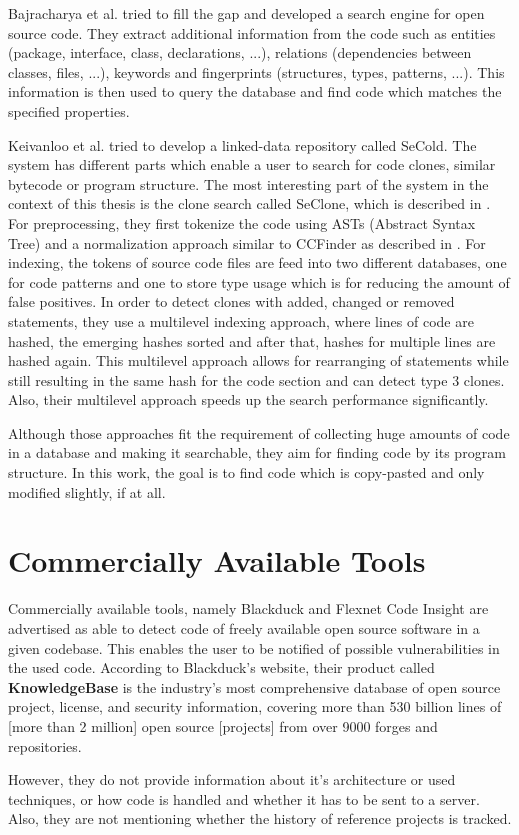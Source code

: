 Bajracharya et al. \cite{bajracharya2006sourcerer} tried to fill the gap and developed a search engine for open source code.
They extract additional information from the code such as entities (package, interface, class, declarations, ...), relations (dependencies between classes, files, ...), keywords and fingerprints (structures, types, patterns, ...).
This information is then used to query the database and find code which matches the specified properties.

Keivanloo et al. \cite{keivanloo2012leveraging,keivanloo2011internet,keivanloo2011seclone,keivanloo2010semantic} tried to develop a linked-data repository called SeCold.
The system has different parts which enable a user to search for code clones, similar bytecode or program structure.
The most interesting part of the system in the context of this thesis is the clone search called SeClone, which is described in \cite{keivanloo2011internet,keivanloo2011seclone}.
For preprocessing, they first tokenize the code using ASTs (Abstract Syntax Tree) and a normalization approach similar to CCFinder as described in \cite{kamiya2002ccfinder}.
For indexing, the tokens of source code files are feed into two different databases, one for code patterns and one to store type usage which is for reducing the amount of false positives.
In order to detect clones with added, changed or removed statements, they use a multilevel indexing approach, where lines of code are hashed, the emerging hashes sorted and after that, hashes for multiple lines are hashed again.
This multilevel approach allows for rearranging of statements while still resulting in the same hash for the code section and can detect type 3 clones.
Also, their multilevel approach speeds up the search performance significantly.

Although those approaches fit the requirement of collecting huge amounts of code in a database and making it searchable, they aim for finding code by its program structure.
In this work, the goal is to find code which is copy-pasted and only modified slightly, if at all.

\section{Commercially Available Tools}
Commercially available tools, namely Blackduck and Flexnet Code Insight are advertised as able to detect code of freely available open source software in a given codebase.
This enables the user to be notified of possible vulnerabilities in the used code.
According to Blackduck's website, their product called \textbf{KnowledgeBase} \glqq is the industry’s most comprehensive database of open source project, license, and security information, covering more than 530 billion lines of [more than 2 million] open source [projects] from over 9000 forges and repositories\grqq \cite{blackduck}.

However, they do not provide information about it's architecture or used techniques, or how code is handled and whether it has to be sent to a server.
Also, they are not mentioning whether the history of reference projects is tracked.